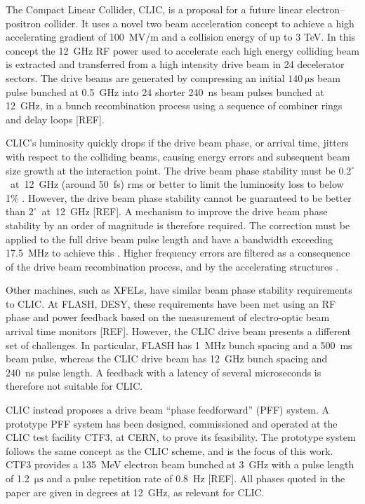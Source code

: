 \documentclass[%
 reprint,
superscriptaddress,
 amsmath,amssymb,
 prl,
]{revtex4-1}
\begin{document}


The Compact Linear Collider, CLIC, \cite{CLICCDR} is a proposal for a future 
linear electron--positron collider. It uses a novel two beam acceleration 
concept to achieve a high accelerating gradient of 100~MV/m 
and a collision energy of up to 3 TeV. In this concept the 12~GHz RF power used 
to accelerate each high energy colliding beam is extracted and transferred from 
a high intensity drive beam in 24 decelerator sectors. The 
drive beams are generated by compressing an initial 
\(140~\mathrm{\mu s}\) beam pulse bunched at 0.5~GHz into 24 shorter 240~ns 
beam pulses bunched at 12~GHz, in a bunch recombination process using a 
sequence 
of combiner rings and delay loops [REF].

CLIC's luminosity quickly drops if the drive beam phase, or arrival time, 
jitters with respect to the colliding beams, causing energy errors and 
subsequent beam size growth at the interaction point. The drive beam phase 
stability must be \(0.2^\circ\)~at~12~GHz (around 50~fs) rms or better to limit 
the luminosity loss to below 1\% \cite{CLICCDR}.  However, the drive beam phase 
stability cannot be guaranteed to be better than \(2^\circ\)~at~12~GHz [REF]. A 
mechanism to improve the drive beam phase stability by an order of magnitude is 
therefore required. The correction must be applied to the full drive beam pulse 
length and have a bandwidth exceeding 17.5~MHz to achieve this 
\cite{Gerber2015}. Higher frequency errors are filtered as a consequence of the 
drive beam recombination process, and by the accelerating structures 
\cite{Gerber2015}.

Other machines, such as XFELs, have similar beam phase stability 	
requirements to CLIC. At FLASH, DESY, these requirements have been met	using 
an RF phase and power feedback based on the measurement of electro-optic beam 
arrival time monitors [REF]. However, the CLIC drive beam presents a different 
set of challenges. In particular, FLASH has 1~MHz bunch spacing and a 500~ms 
beam pulse, whereas the CLIC drive beam has 12~GHz bunch spacing and 240~ns 
pulse length. A feedback with a latency of several microseconds is therefore 
not suitable for CLIC.

CLIC instead proposes a drive beam ``phase feedforward'' (PFF) 
system. A prototype PFF system has been designed, commissioned and operated at 
the CLIC test facility CTF3, at CERN, to prove its feasibility. The prototype 
system follows the same concept as the CLIC scheme, and is the focus 
of this work. CTF3 provides a 135~MeV electron beam bunched at 3~GHz with a 
pulse length of 1.2~\(\mathrm{\mu s}\) and a pulse repetition rate of 0.8~Hz 
[REF]. All phases quoted in the paper are given in degrees at 12~GHz, as 
relevant for CLIC.
\end{document}
